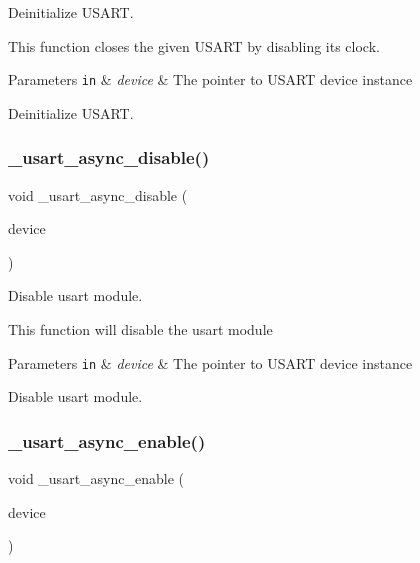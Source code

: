 Deinitialize U\+S\+A\+RT. 

This function closes the given U\+S\+A\+RT by disabling its clock.


\begin{DoxyParams}[1]{Parameters}
\mbox{\tt in}  & {\em device} & The pointer to U\+S\+A\+RT device instance\\
\hline
\end{DoxyParams}
Deinitialize U\+S\+A\+RT. \mbox{\label{group___h_p_l_gadb6751e5c270eb88eb754f45e7b8a91f}} 
\subsubsection{\texorpdfstring{\+\_\+usart\+\_\+async\+\_\+disable()}{\_usart\_async\_disable()}}
{\footnotesize\ttfamily void \+\_\+usart\+\_\+async\+\_\+disable (\begin{DoxyParamCaption}\item[{struct \hyperlink{struct__usart__async__device}{\+\_\+usart\+\_\+async\+\_\+device} $\ast$const}]{device }\end{DoxyParamCaption})}



Disable usart module. 

This function will disable the usart module


\begin{DoxyParams}[1]{Parameters}
\mbox{\tt in}  & {\em device} & The pointer to U\+S\+A\+RT device instance\\
\hline
\end{DoxyParams}
Disable usart module. \mbox{\label{group___h_p_l_ga86c4101798d9dbc584f1e56615140d6f}} 
\subsubsection{\texorpdfstring{\+\_\+usart\+\_\+async\+\_\+enable()}{\_usart\_async\_enable()}}
{\footnotesize\ttfamily void \+\_\+usart\+\_\+async\+\_\+enable (\begin{DoxyParamCaption}\item[{struct \hyperlink{struct__usart__async__device}{\+\_\+usart\+\_\+async\+\_\+device} $\ast$const}]{device }\end{DoxyParamCaption})}



